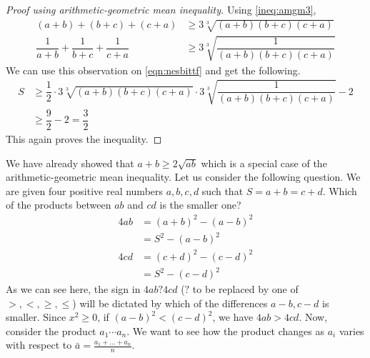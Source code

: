 \documentclass{subfile}
\begin{document}
		\begin{proof}[Proof using arithmetic-geometric mean inequality]
			Using \ref{ineq:amgm3},
				\begin{align*}
					(a+b)+(b+c)+(c+a)
						& \geq3\sqrt[3]{(a+b)(b+c)(c+a)}\\
					\dfrac{1}{a+b}+\dfrac{1}{b+c}+\dfrac{1}{c+a}
						& \geq3\sqrt[3]{\dfrac{1}{(a+b)(b+c)(c+a)}}
				\end{align*}
			We can use this observation on \hyperref[eqn:nesbittf]{\ref{eqn:nesbittf}} and get the following.
				\begin{align*}
					S
						& \geq\dfrac{1}{2}\cdot3\sqrt[3]{(a+b)(b+c)(c+a)}\cdot3\sqrt[3]{\dfrac{1}{(a+b)(b+c)(c+a)}}-2\\
						& \geq\dfrac{9}{2}-2=\dfrac{3}{2}
				\end{align*}
			This again proves the inequality.
		\end{proof}
	We have already showed that $a+b\geq2\sqrt{ab}$ which is a special case of the arithmetic-geometric mean inequality. Let us consider the following question. We are given four positive real numbers $a,b,c,d$ such that $S=a+b=c+d$. Which of the products between $ab$ and $cd$ is the smaller one?
		\begin{align*}
			4ab
				& = (a+b)^2-(a-b)^2\\
				& = S^2-(a-b)^2\\
			4cd
				& = (c+d)^2-(c-d)^2\\
				& = S^2-(c-d)^2
		\end{align*}
	As we can see here, the sign in $4ab?4cd$ ($?$ to be replaced by one of $>,<,\geq,\leq$) will be dictated by which of the differences $a-b,c-d$ is smaller. Since $x^2\geq0$, if $(a-b)^2<(c-d)^2$, we have $4ab>4cd$. Now, consider the product $a_1\cdots a_n$. We want to see how the product changes as $a_i$ varies with respect to $\bar{a}=\frac{a_1+\ldots+a_n}{n}$.
	
\end{document}
